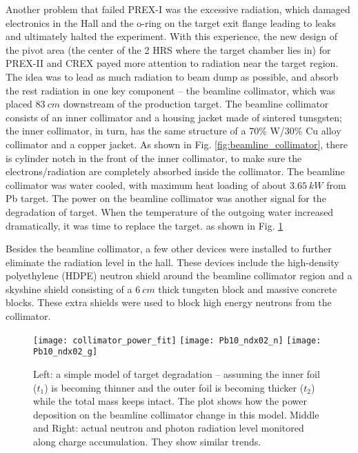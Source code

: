 Another problem that failed PREX-I was the excessive radiation, which damaged 
electronics in the Hall and the o-ring on the target exit flange leading to
leaks and ultimately halted the experiment.
With this experience, the new design of the pivot area (the center of the 2 HRS 
where the target chamber lies in) for PREX-II and CREX payed more attention
to radiation near the target region. The idea was to lead as much radiation to
beam dump as possible, and absorb the rest radiation in one key component --
the beamline collimator, which was placed $83\ cm$ downstream of the production 
target. The beamline collimator consists of an inner collimator and a housing
jacket made of sintered tunsgsten; the inner collimator, in turn, has the same 
structure of a 70\% W/30\% Cu alloy collimator and a copper jacket. As shown
in Fig. \ref{fig:beamline_collimator}, there is cylinder notch in the front of
the inner collimator, to make sure the electrons/radiation are completely 
absorbed inside the collimator. The beamline collimator was water cooled, with
maximum heat loading of about $3.65\ kW$ from Pb target. The power on the beamline
collimator was another signal for the degradation of target. When the temperature 
of the outgoing water increased dramatically, it was time to replace the target.
as shown in Fig. \ref{fig:collimator_see_target_degradation}

Besides the beamline collimator, a few other devices were installed 
to further eliminate the radiation level in the hall. These devices include the 
high-density polyethylene (HDPE) neutron shield around the beamline collimator
region and a skyshine shield consisting of a $6\ cm$ thick tungsten block and
massive concrete blocks. These extra shields were used to block high energy
neutrons from the collimator.

\begin{figure}[h!]
    \texttt{[image: collimator\_power\_fit]}
    \texttt{[image: Pb10\_ndx02\_n]}
    \texttt{[image: Pb10\_ndx02\_g]}
    \caption{Left: a simple model of target degradation -- assuming the inner 
    foil ($t_1$) is becoming thinner and the outer foil is becoming thicker ($t_2$) 
    while the total mass keeps intact. The plot shows how the power deposition 
    on the beamline collimator change in this model. Middle and Right: actual
    neutron and photon radiation level monitored along charge accumulation. They
    show similar trends.}
    \label{fig:collimator_see_target_degradation}
\end{figure}

